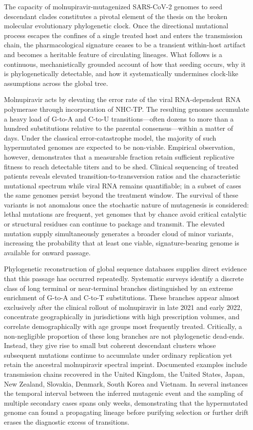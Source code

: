 The capacity of molnupiravir-mutagenized SARS-CoV-2 genomes to seed descendant clades constitutes a pivotal element of the thesis on the broken molecular evolutionary phylogenetic clock. Once the directional mutational process escapes the confines of a single treated host and enters the transmission chain, the pharmacological signature ceases to be a transient within-host artifact and becomes a heritable feature of circulating lineages. What follows is a continuous, mechanistically grounded account of how that seeding occurs, why it is phylogenetically detectable, and how it systematically undermines clock-like assumptions across the global tree.

Molnupiravir acts by elevating the error rate of the viral RNA-dependent RNA polymerase through incorporation of NHC-TP. The resulting genomes accumulate a heavy load of G-to-A and C-to-U transitions—often dozens to more than a hundred substitutions relative to the parental consensus—within a matter of days. Under the classical error-catastrophe model, the majority of such hypermutated genomes are expected to be non-viable. Empirical observation, however, demonstrates that a measurable fraction retain sufficient replicative fitness to reach detectable titers and to be shed. Clinical sequencing of treated patients reveals elevated transition-to-transversion ratios and the characteristic mutational spectrum while viral RNA remains quantifiable; in a subset of cases the same genomes persist beyond the treatment window. The survival of these variants is not anomalous once the stochastic nature of mutagenesis is considered: lethal mutations are frequent, yet genomes that by chance avoid critical catalytic or structural residues can continue to package and transmit. The elevated mutation supply simultaneously generates a broader cloud of minor variants, increasing the probability that at least one viable, signature-bearing genome is available for onward passage.

Phylogenetic reconstruction of global sequence databases supplies direct evidence that this passage has occurred repeatedly. Systematic surveys identify a discrete class of long terminal or near-terminal branches distinguished by an extreme enrichment of G-to-A and C-to-T substitutions. These branches appear almost exclusively after the clinical rollout of molnupiravir in late 2021 and early 2022, concentrate geographically in jurisdictions with high prescription volumes, and correlate demographically with age groups most frequently treated. Critically, a non-negligible proportion of these long branches are not phylogenetic dead-ends. Instead, they give rise to small but coherent descendant clusters whose subsequent mutations continue to accumulate under ordinary replication yet retain the ancestral molnupiravir spectral imprint. Documented examples include transmission chains recovered in the United Kingdom, the United States, Japan, New Zealand, Slovakia, Denmark, South Korea and Vietnam. In several instances the temporal interval between the inferred mutagenic event and the sampling of multiple secondary cases spans only weeks, demonstrating that the hypermutated genome can found a propagating lineage before purifying selection or further drift erases the diagnostic excess of transitions.

